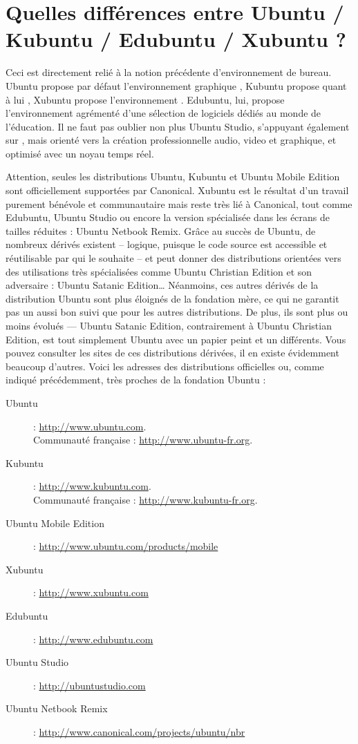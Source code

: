 \section{Quelles différences entre Ubuntu / Kubuntu / Edubuntu / Xubuntu ?}
Ceci est directement relié à la notion précédente d'environnement de bureau. Ubuntu propose par défaut l'environnement graphique , Kubuntu propose quant à lui , Xubuntu propose l'environnement . Edubuntu, lui, propose l'environnement  agrémenté d'une sélection de logiciels dédiés au monde de l'éducation. Il ne faut pas oublier non plus Ubuntu Studio, s'appuyant également sur , mais orienté vers la création professionnelle audio, video et graphique, et optimisé avec un noyau temps réel.\par
Attention, seules les distributions Ubuntu, Kubuntu et Ubuntu Mobile Edition sont officiellement supportées par Canonical. Xubuntu est le résultat d'un travail purement bénévole et communautaire mais reste très lié à Canonical, tout comme Edubuntu, Ubuntu Studio ou encore la version spécialisée dans les écrans de tailles réduites : Ubuntu Netbook Remix. Grâce au succès de Ubuntu, de nombreux dérivés existent -- logique, puisque le code source est accessible et réutilisable par qui le souhaite -- et peut donner des distributions orientées vers des utilisations très spécialisées comme Ubuntu Christian Edition et son adversaire : Ubuntu Satanic Edition\ldots{} Néanmoins, ces autres dérivés de la distribution Ubuntu sont plus éloignés de la fondation mère, ce qui ne garantit pas un aussi bon suivi que pour les autres distributions. De plus, ils sont plus ou moins évolués --- Ubuntu Satanic Edition, contrairement à Ubuntu Christian Edition, est tout simplement Ubuntu avec un papier peint et un  différents. Vous pouvez consulter les sites de ces distributions dérivées, il en existe évidemment beaucoup d'autres. Voici les adresses des distributions officielles ou, comme indiqué précédemment, très proches de la fondation Ubuntu :
\begin{description}
\item [Ubuntu] : \url{http://www.ubuntu.com}.\\Communauté française : \url{http://www.ubuntu-fr.org}.
\item [Kubuntu] : \url{http://www.kubuntu.com}.\\Communauté française : \url{http://www.kubuntu-fr.org}. 
\item [Ubuntu Mobile Edition] : \url{http://www.ubuntu.com/products/mobile}
\item [Xubuntu] : \url{http://www.xubuntu.com}
\item [Edubuntu] : \url{http://www.edubuntu.com}
\item [Ubuntu Studio] : \url{http://ubuntustudio.com}
\item [Ubuntu Netbook Remix] : \url{http://www.canonical.com/projects/ubuntu/nbr}
\end{description}
